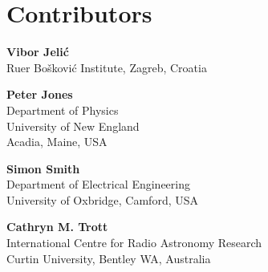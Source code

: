 
\chapter*{Contributors}
 


{\parskip=12pt

\noindent\textbf{Vibor Jeli\'c}\\
Ru{\dj}er Bo\v{s}kovi\'{c} Institute, Zagreb, Croatia 

\noindent\textbf{Peter Jones}\\
Department of Physics\\
University of New England\\
Acadia, Maine, USA

\noindent\textbf{Simon Smith}\\
Department of Electrical Engineering\\
University of Oxbridge, 
Camford, USA

\noindent\textbf{Cathryn M. Trott}\\
International Centre for Radio Astronomy Research\\
Curtin University, Bentley WA, Australia

}
